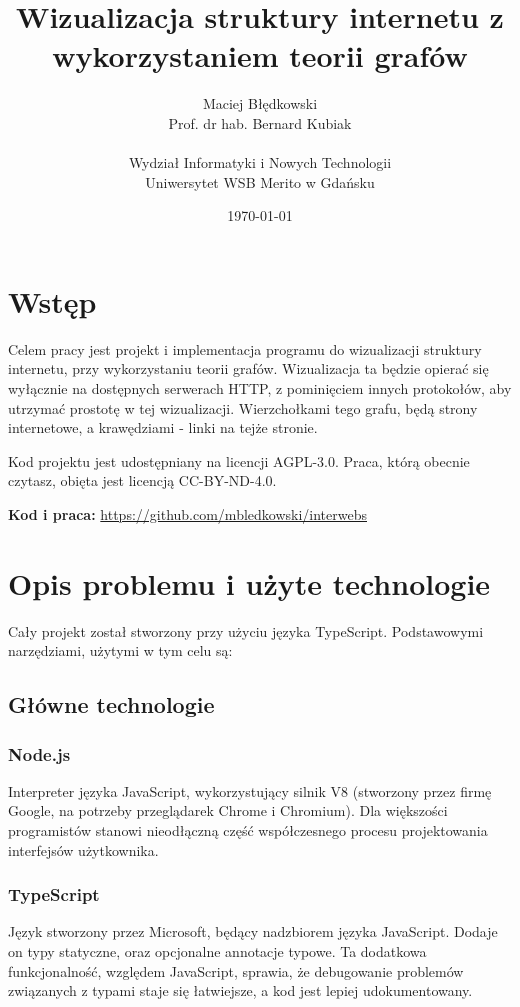\documentclass[a4paper, 12pt]{article}
\title{Wizualizacja struktury internetu z wykorzystaniem teorii grafów}
\author{Maciej Błędkowski \\ Prof. dr hab. Bernard Kubiak \\ \\ Wydział Informatyki i Nowych Technologii \\ Uniwersytet WSB Merito w Gdańsku}
\date{\today}
\begin{document}
\maketitle

\tableofcontents

\section{Wstęp}
Celem pracy jest projekt i implementacja programu do wizualizacji struktury internetu, przy wykorzystaniu teorii grafów. Wizualizacja ta będzie opierać się wyłącznie na dostępnych serwerach HTTP, z pominięciem innych protokołów, aby utrzymać prostotę w tej wizualizacji. Wierzchołkami tego grafu, będą strony internetowe, a krawędziami - linki na tejże stronie.

Kod projektu jest udostępniany na licencji AGPL-3.0. Praca, którą obecnie czytasz, obięta jest licencją CC-BY-ND-4.0.

\textbf{Kod i praca:} \url{https://github.com/mbledkowski/interwebs}

\section{Opis problemu i użyte technologie}
Cały projekt został stworzony przy użyciu języka TypeScript. Podstawowymi narzędziami, użytymi w tym celu są:

\subsection{Główne technologie}
\subsubsection{Node.js}
Interpreter języka JavaScript, wykorzystujący silnik V8 (stworzony przez firmę Google, na potrzeby przeglądarek Chrome i Chromium\cite{aboutV8Doc}).\cite{aboutNodejsDoc} Dla większości programistów stanowi nieodłączną część współczesnego procesu projektowania interfejsów użytkownika.
\subsubsection{TypeScript}
Język stworzony przez Microsoft, będący nadzbiorem języka JavaScript. Dodaje on typy statyczne, oraz opcjonalne annotacje typowe.\cite{arstechnicaTypescript} Ta dodatkowa funkcjonalność, względem JavaScript, sprawia, że debugowanie problemów związanych z typami staje się łatwiejsze, a kod jest lepiej udokumentowany.
\end{document}
